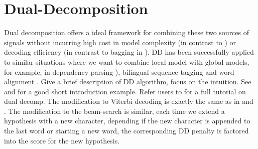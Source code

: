 \section{Dual-Decomposition}

Dual decomposition offers a ideal framework for combining these two sources of signals without incurring high cost in model complexity (in contrast to \cite{Sun:2009:HLT-NAACL}) or decoding efficiency (in contrast to bagging in \cite{Wang:2006:SIGHAN,Sun:2010:COLING}).
DD has been successfully applied to similar situations where we want to combine local model with global models, for example, in dependency parsing \cite{Koo:2010:EMNLP}), bilingual sequence tagging \cite{Wang:2013:ACL} and word alignment \cite{}.  
Give a brief description of DD algorithm, focus on the intuition. See \cite{Wang:2013:ACL} and \cite{Denero:2011:ACL} for a good short introduction example.
Refer users to \cite{Rush:2012:JAIR} for a full tutorial on dual decomp.
The modification to Viterbi decoding is exactly the same as in \cite{Wang:2013:ACL} and \cite{Denero:2011:ACL}. The modification to the beam-search is similar, each time we extend a hypothesis with a new character, depending if the new character is appended to the last word or starting a new word, the corresponding DD penalty is factored into the score for the new hypothesis. 

